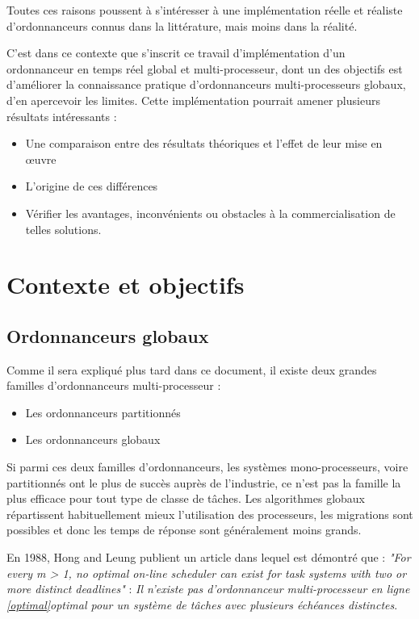 \documentclass[11pt,a4paper,oneside]{report}
\begin{document}
	Toutes ces raisons poussent à s'intéresser à une implémentation réelle et réaliste 
	d'ordonnanceurs connus dans la littérature, mais moins dans la réalité.
	
	C'est dans ce contexte que s'inscrit ce travail d'implémentation d'un ordonnanceur en temps réel 
	global et multi-processeur, dont un des objectifs est d'améliorer la connaissance pratique 
	d'ordonnanceurs multi-processeurs globaux, d'en apercevoir les limites. 
	Cette implémentation pourrait amener plusieurs résultats intéressants : \medskip
	\begin{itemize}
		\item Une comparaison entre des résultats théoriques et l'effet de leur mise 
		en \oe{}uvre
		\item L'origine de ces différences
		\item Vérifier les avantages, inconvénients ou obstacles à la 
		commercialisation de telles solutions.
	\end{itemize}
	
	\section{Contexte et objectifs}
	
	\subsection{Ordonnanceurs globaux}
	Comme il sera expliqué plus tard dans ce document, il existe deux grandes familles d'ordonnanceurs 
	multi-processeur :\medskip
	\begin{itemize}
		\item Les ordonnanceurs partitionnés
		\item Les ordonnanceurs globaux
	\end{itemize}
	Si parmi ces deux familles d'ordonnanceurs, les systèmes mono-processeurs, voire 
	partitionnés ont le plus de succès auprès de l'industrie, 
	ce n'est pas la famille la plus efficace pour tout type de classe de tâches. 
	Les algorithmes globaux répartissent habituellement mieux l'utilisation des processeurs, 
	les migrations sont possibles et donc les temps de réponse sont généralement moins grands.
	\medskip
	
	
	En 1988, Hong and Leung \cite{hong_-line_1988} publient un article dans lequel est 
	démontré que : \medskip
	\textit{"For every m > 1, no optimal on-line scheduler can exist for task systems with two or more distinct deadlines"} : 
	\textit{Il n'existe pas d'ordonnanceur multi-processeur en ligne \ref{optimal}{optimal} pour un système de tâches 
		avec plusieurs échéances distinctes}.
	
\end{document}

